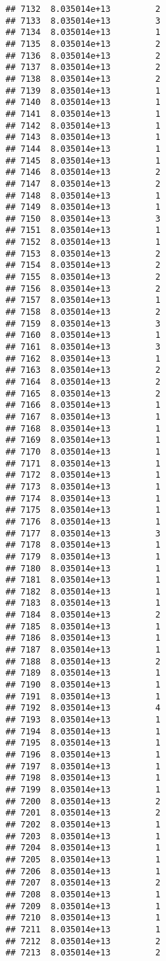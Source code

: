 \documentclass[
]{article}
\begin{document}
\begin{verbatim}
## 7132  8.035014e+13         2
## 7133  8.035014e+13         3
## 7134  8.035014e+13         1
## 7135  8.035014e+13         2
## 7136  8.035014e+13         2
## 7137  8.035014e+13         2
## 7138  8.035014e+13         2
## 7139  8.035014e+13         1
## 7140  8.035014e+13         1
## 7141  8.035014e+13         1
## 7142  8.035014e+13         1
## 7143  8.035014e+13         1
## 7144  8.035014e+13         1
## 7145  8.035014e+13         1
## 7146  8.035014e+13         2
## 7147  8.035014e+13         2
## 7148  8.035014e+13         1
## 7149  8.035014e+13         1
## 7150  8.035014e+13         3
## 7151  8.035014e+13         1
## 7152  8.035014e+13         1
## 7153  8.035014e+13         2
## 7154  8.035014e+13         2
## 7155  8.035014e+13         2
## 7156  8.035014e+13         2
## 7157  8.035014e+13         1
## 7158  8.035014e+13         2
## 7159  8.035014e+13         3
## 7160  8.035014e+13         1
## 7161  8.035014e+13         3
## 7162  8.035014e+13         1
## 7163  8.035014e+13         2
## 7164  8.035014e+13         2
## 7165  8.035014e+13         2
## 7166  8.035014e+13         1
## 7167  8.035014e+13         1
## 7168  8.035014e+13         1
## 7169  8.035014e+13         1
## 7170  8.035014e+13         1
## 7171  8.035014e+13         1
## 7172  8.035014e+13         1
## 7173  8.035014e+13         1
## 7174  8.035014e+13         1
## 7175  8.035014e+13         1
## 7176  8.035014e+13         1
## 7177  8.035014e+13         3
## 7178  8.035014e+13         1
## 7179  8.035014e+13         1
## 7180  8.035014e+13         1
## 7181  8.035014e+13         1
## 7182  8.035014e+13         1
## 7183  8.035014e+13         1
## 7184  8.035014e+13         2
## 7185  8.035014e+13         1
## 7186  8.035014e+13         1
## 7187  8.035014e+13         1
## 7188  8.035014e+13         2
## 7189  8.035014e+13         1
## 7190  8.035014e+13         1
## 7191  8.035014e+13         1
## 7192  8.035014e+13         4
## 7193  8.035014e+13         1
## 7194  8.035014e+13         1
## 7195  8.035014e+13         1
## 7196  8.035014e+13         1
## 7197  8.035014e+13         1
## 7198  8.035014e+13         1
## 7199  8.035014e+13         1
## 7200  8.035014e+13         2
## 7201  8.035014e+13         2
## 7202  8.035014e+13         1
## 7203  8.035014e+13         1
## 7204  8.035014e+13         1
## 7205  8.035014e+13         1
## 7206  8.035014e+13         1
## 7207  8.035014e+13         2
## 7208  8.035014e+13         1
## 7209  8.035014e+13         1
## 7210  8.035014e+13         1
## 7211  8.035014e+13         1
## 7212  8.035014e+13         2
## 7213  8.035014e+13         2

\end{verbatim}
\end{document}

